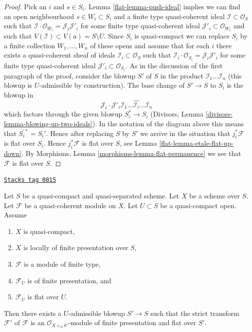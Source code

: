\begin{proof}
\medskip\noindent
Pick an $i$ and $s \in S_i$. Lemma \ref{flat-lemma-push-ideal}
implies we can find an open neighbourhood $s \in W_i \subset S_i$
and a finite type quasi-coherent ideal $\mathcal{I} \subset \mathcal{O}_S$
such that $\mathcal{I} \cdot \mathcal{O}_{W_i} = \mathcal{J}_i \mathcal{J}'_i$
for some finite type quasi-coherent ideal
$\mathcal{J}'_i \subset \mathcal{O}_{W_i}$
and such that $V(\mathcal{I}) \subset V(a) = S \setminus U$.
Since $S_i$ is quasi-compact we can replace $S_i$ by a finite collection
$W_1, \ldots, W_n$ of these opens and assume that for each $i$ there exists
a quasi-coherent sheaf of ideals $\mathcal{I}_i \subset \mathcal{O}_S$ such
that $\mathcal{I}_i \cdot \mathcal{O}_{S_i} = \mathcal{J}_i \mathcal{J}'_i$
for some finite type quasi-coherent ideal
$\mathcal{J}'_i \subset \mathcal{O}_{S_i}$.
As in the discussion of the first paragraph of the proof, consider the
blowup $S'$ of $S$ in the product $\mathcal{I}_1 \ldots \mathcal{I}_n$
(this blowup is $U$-admissible by construction). The base change of $S' \to S$
to $S_i$ is the blowup in
$$
\mathcal{J}_i \cdot
\mathcal{J}'_i \mathcal{I}_1 \ldots \hat{\mathcal{I}_i} \ldots \mathcal{I}_n
$$
which factors through the given blowup $S_i^* \to S_i$
(Divisors, Lemma \ref{divisors-lemma-blowing-up-two-ideals}). In the notation
of the diagram above this means that $S_i^{\prime *} = S_i'$. Hence
after replacing $S$ by $S'$ we arrive in the situation that
$j_i^*\mathcal{F}$ is flat over $S_i$. Hence $j_i^*\mathcal{F}$ is flat
over $S$, see
Lemma \ref{flat-lemma-etale-flat-up-down}.
By Morphisms, Lemma \ref{morphisms-lemma-flat-permanence}
we see that $\mathcal{F}$ is flat over $S$.
\end{proof}

\begin{theorem}
\label{flat-theorem-flatten-module}
\href{https://stacks.math.columbia.edu/tag/0815}{\texttt{Stacks tag 0815}}

Let $S$ be a quasi-compact and quasi-separated scheme.
Let $X$ be a scheme over $S$.
Let $\mathcal{F}$ be a quasi-coherent module on $X$.
Let $U \subset S$ be a quasi-compact open. Assume
\begin{enumerate}
\item $X$ is quasi-compact,
\item $X$ is locally of finite presentation over $S$,
\item $\mathcal{F}$ is a module of finite type,
\item $\mathcal{F}_U$ is of finite presentation, and
\item $\mathcal{F}_U$ is flat over $U$.
\end{enumerate}
Then there exists a $U$-admissible blowup $S' \to S$ such that the
strict transform $\mathcal{F}'$ of $\mathcal{F}$ is an
$\mathcal{O}_{X \times_S S'}$-module of finite presentation and
flat over $S'$.
\end{theorem}

